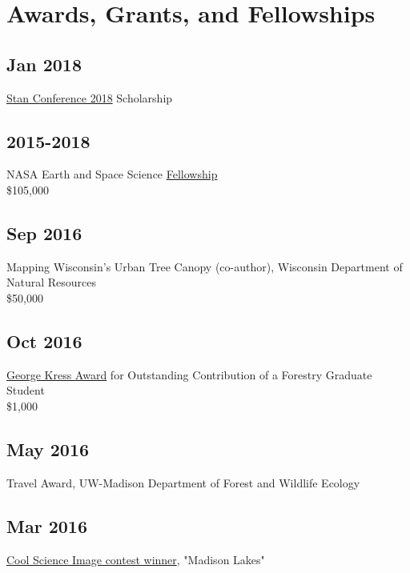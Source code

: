 \documentclass{article}
\begin{document}
\section*{Awards, Grants, and Fellowships}
\label{sec:org6eefe4d}
\subsection*{Jan 2018}
\label{sec:org3cae8b9}
\href{http://mc-stan.org/events/}{Stan Conference 2018} Scholarship

\subsection*{2015-2018}
\label{sec:org4b59140}
NASA Earth and Space Science \href{https://nspires.nasaprs.com/external/viewrepositorydocument/cmdocumentid=459947/solicitationId=\%7BB6CDCEA6-8EDD-A48A-FAF8-E588F66661C3\%7D/viewSolicitationDocument=1/NESSF15\%20selections.pdf}{Fellowship}\\
\$105,000

\subsection*{Sep 2016}
\label{sec:org6d10285}
Mapping Wisconsin's Urban Tree Canopy (co-author), Wisconsin
Department of Natural Resources\\
\$50,000

\subsection*{Oct 2016}
\label{sec:org21f76c6}
\href{https://kb.wisc.edu/russell/page.php?id=65402}{George Kress Award} for Outstanding Contribution of a Forestry Graduate
Student \\
\$1,000

\subsection*{May 2016}
\label{sec:orgb495d04}
Travel Award, UW-Madison Department of Forest and Wildlife Ecology\\

\subsection*{Mar 2016}
\label{sec:org708b3d7}
\href{http://news.wisc.edu/cool-science-images-2016/\#\&gid=1\&pid=10}{Cool Science Image contest winner}, "Madison Lakes" \\
\end{document}
